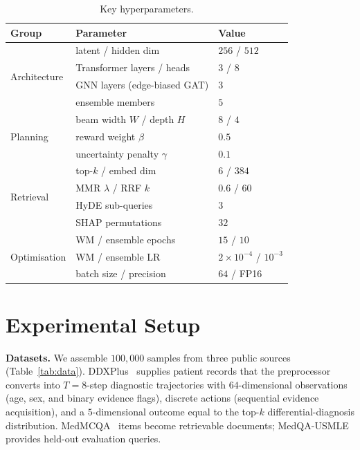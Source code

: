 \documentclass[conference]{IEEEtran}
\begin{document}
\begin{table}[t]
\caption{Key hyperparameters.}
\label{tab:hyper}
\centering
\small
\begin{tabular}{lll}
\toprule
\textbf{Group} & \textbf{Parameter} & \textbf{Value}\\
\midrule
\multirow{4}{*}{Architecture}
  & latent / hidden dim        & $256$ / $512$ \\
  & Transformer layers / heads & $3$ / $8$ \\
  & GNN layers (edge-biased GAT)& $3$ \\
  & ensemble members           & $5$ \\
\midrule
\multirow{3}{*}{Planning}
  & beam width $W$ / depth $H$  & $8$ / $4$ \\
  & reward weight $\beta$       & $0.5$ \\
  & uncertainty penalty $\gamma$& $0.1$ \\
\midrule
\multirow{4}{*}{Retrieval}
  & top-$k$ / embed dim         & $6$ / $384$ \\
  & MMR $\lambda$ / RRF $k$      & $0.6$ / $60$ \\
  & HyDE sub-queries            & $3$ \\
  & SHAP permutations           & $32$ \\
\midrule
\multirow{3}{*}{Optimisation}
  & WM / ensemble epochs        & $15$ / $10$ \\
  & WM / ensemble LR            & $2\!\times\!10^{-4}$ / $10^{-3}$ \\
  & batch size / precision      & $64$ / FP16 \\
\bottomrule
\end{tabular}
\end{table}

\section{Experimental Setup}
\textbf{Datasets.} We assemble $100{,}000$ samples from three public sources
(Table~\ref{tab:data}). DDXPlus~\cite{tchango2022ddxplus} supplies patient
records that the preprocessor converts into $T{=}8$-step diagnostic
trajectories with $64$-dimensional observations (age, sex, and binary evidence
flags), discrete actions (sequential evidence acquisition), and a
$5$-dimensional outcome equal to the top-$k$ differential-diagnosis
distribution. MedMCQA~\cite{pal2022medmcqa} items become retrievable
documents; MedQA-USMLE~\cite{jin2021medqa} provides held-out evaluation
queries.
\end{document}
